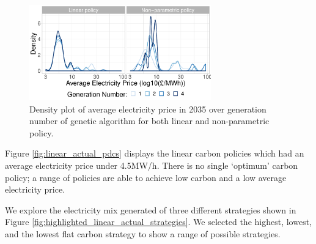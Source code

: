 \begin{figure}
	\centering
	\includegraphics[width=0.7\textwidth,]{Chapter6/figures/results/linear_and_free_ga_development_distribution_avg_elec_price.pdf}
	\caption{Density plot of average electricity price in 2035 over generation number of genetic algorithm for both linear and non-parametric policy.}
	\label{fig:comparison_of_distributions}
\end{figure}

Figure \ref{fig:linear_actual_pdcs} displays the linear carbon policies which had an average electricity price under \textsterling4.5MW/h. There is no single `optimum' carbon policy; a range of policies are able to achieve low carbon and a low average electricity price.


We explore the electricity mix generated of three different strategies shown in Figure \ref{fig:highlighted_linear_actual_strategies}. We selected the highest, lowest, and the lowest flat carbon strategy to show a range of possible strategies.

%





